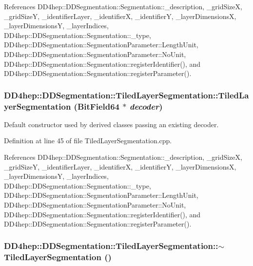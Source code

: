 References DD4hep::DDSegmentation::Segmentation::\_\-description, \_\-gridSizeX, \_\-gridSizeY, \_\-identifierLayer, \_\-identifierX, \_\-identifierY, \_\-layerDimensionsX, \_\-layerDimensionsY, \_\-layerIndices, DD4hep::DDSegmentation::Segmentation::\_\-type, DD4hep::DDSegmentation::SegmentationParameter::LengthUnit, DD4hep::DDSegmentation::SegmentationParameter::NoUnit, DD4hep::DDSegmentation::Segmentation::registerIdentifier(), and DD4hep::DDSegmentation::Segmentation::registerParameter().\hypertarget{class_d_d4hep_1_1_d_d_segmentation_1_1_tiled_layer_segmentation_ade81bfe57661f1faf98877b6e4de725e}{
\subsubsection[{TiledLayerSegmentation}]{\setlength{\rightskip}{0pt plus 5cm}DD4hep::DDSegmentation::TiledLayerSegmentation::TiledLayerSegmentation ({\bf BitField64} $\ast$ {\em decoder})}}
\label{class_d_d4hep_1_1_d_d_segmentation_1_1_tiled_layer_segmentation_ade81bfe57661f1faf98877b6e4de725e}


Default constructor used by derived classes passing an existing decoder. 

Definition at line 45 of file TiledLayerSegmentation.cpp.

References DD4hep::DDSegmentation::Segmentation::\_\-description, \_\-gridSizeX, \_\-gridSizeY, \_\-identifierLayer, \_\-identifierX, \_\-identifierY, \_\-layerDimensionsX, \_\-layerDimensionsY, \_\-layerIndices, DD4hep::DDSegmentation::Segmentation::\_\-type, DD4hep::DDSegmentation::SegmentationParameter::LengthUnit, DD4hep::DDSegmentation::SegmentationParameter::NoUnit, DD4hep::DDSegmentation::Segmentation::registerIdentifier(), and DD4hep::DDSegmentation::Segmentation::registerParameter().\hypertarget{class_d_d4hep_1_1_d_d_segmentation_1_1_tiled_layer_segmentation_ac4a4730758ab96a1215fb55999503af2}{
\subsubsection[{$\sim$TiledLayerSegmentation}]{\setlength{\rightskip}{0pt plus 5cm}DD4hep::DDSegmentation::TiledLayerSegmentation::$\sim$TiledLayerSegmentation ()}}
\label{class_d_d4hep_1_1_d_d_segmentation_1_1_tiled_layer_segmentation_ac4a4730758ab96a1215fb55999503af2}


